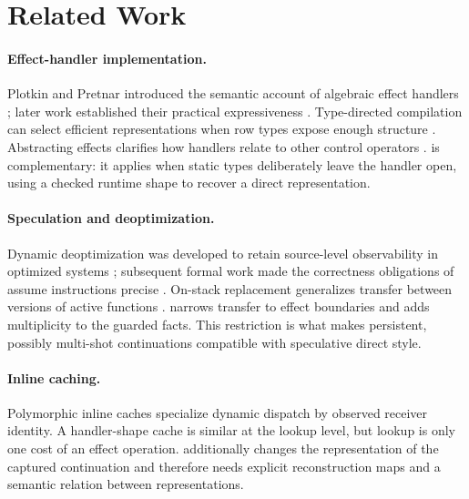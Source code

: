 \section{Related Work}
\label{sec:related}

\paragraph{Effect-handler implementation.}
Plotkin and Pretnar introduced the semantic account of algebraic effect
handlers \cite{plotkin2009handlers}; later work established their practical
expressiveness \cite{kammar2013handlers}. Type-directed compilation can select
efficient representations when row types expose enough structure
\cite{leijen2017type}. Abstracting effects clarifies how handlers relate to
other control operators \cite{biernacki2020abstracting}. \system is
complementary: it applies when static types deliberately leave the handler
open, using a checked runtime shape to recover a direct representation.

\paragraph{Speculation and deoptimization.}
Dynamic deoptimization was developed to retain source-level observability in
optimized systems \cite{holzle1992debugging}; subsequent formal work made the
correctness obligations of assume instructions precise
\cite{fluckiger2018correctness}. On-stack replacement generalizes transfer
between versions of active functions \cite{delia2018osr}. \system narrows
transfer to effect boundaries and adds multiplicity to the guarded facts. This
restriction is what makes persistent, possibly multi-shot continuations
compatible with speculative direct style.

\paragraph{Inline caching.}
Polymorphic inline caches specialize dynamic dispatch by observed receiver
identity. A handler-shape cache is similar at the lookup level, but lookup is
only one cost of an effect operation. \system additionally changes the
representation of the captured continuation and therefore needs explicit
reconstruction maps and a semantic relation between representations.
